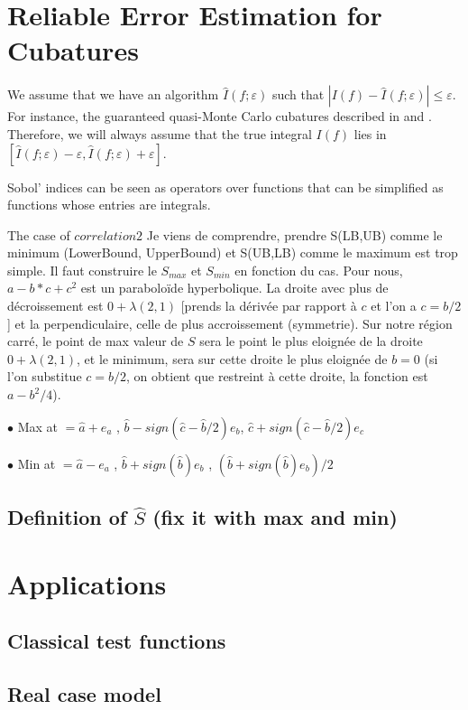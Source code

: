 \documentclass[]{elsarticle}
\theoremstyle{definition}
\def\abs#1{\ensuremath{\left \lvert #1 \right \rvert}}
\begin{document}

\section{Reliable Error Estimation for Cubatures}
\label{section.error} 
We assume that we have an algorithm $\widehat{I}(f;\varepsilon)$ such that $\abs{I(f)-\widehat{I}(f;\varepsilon)}\leq \varepsilon$. For instance, the guaranteed quasi-Monte Carlo cubatures described in \cite{-} and \cite{-}. Therefore, we will always assume that the true integral $I(f)$ lies in $[\widehat{I}(f;\varepsilon)-\varepsilon,\widehat{I}(f;\varepsilon)+\varepsilon]$.

Sobol' indices can be seen as operators over functions that can be simplified as functions whose entries are integrals.

The case of $correlation 2$
Je viens de comprendre, prendre S(LB,UB) comme le minimum (LowerBound, UpperBound) et S(UB,LB) comme le maximum est trop simple. Il faut construire le $S_{max}$ et $S_{min}$ en fonction du cas.
Pour nous, $a - b*c + c^2$ est un paraboloïde hyperbolique. La droite avec plus de décroissement est $0+\lambda(2,1)$ [prends la dérivée par rapport à $c$ et l'on a $c=b/2$] et la perpendiculaire, celle de plus accroissement (symmetrie). Sur notre région carré, le point de max valeur de $S$ sera le point le plus eloignée de la droite $0+\lambda(2,1)$, et le minimum, sera sur cette droite le plus eloignée de $b = 0$ (si l'on substitue $c=b/2$, on obtient que restreint à cette droite, la fonction est $a-b^2/4$).

$\bullet$ Max at $= \hat{a} + e_a$  ,  $\hat{b} - sign(\hat{c}-\hat{b}/2) e_b$,  $\hat{c} + sign(\hat{c}-\hat{b}/2) e_c$

$\bullet$ Min at $= \hat{a} - e_a$  ,  $\hat{b} + sign(\hat{b}) e_b$  ,  $(\hat{b} + sign(\hat{b}) e_b)/2$
\subsection{Definition of $\widehat{S}$ (fix it with max and min)}


\section{Applications}
\subsection{Classical test functions}
\subsection{Real case model}
\end{document}
